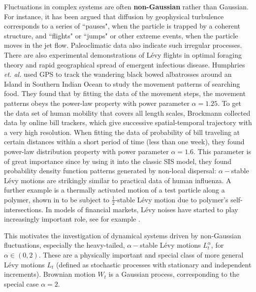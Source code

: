 \documentclass[11pt]{article}
\begin{document}
Fluctuations in complex systems   are often
{\bf non-Gaussian} \cite{Woy,Dit,Swinney,Shlesinger,taqqu,dybiec2009levy}
rather than Gaussian.
For instance, it has been argued
that diffusion by geophysical turbulence \cite{Shlesinger}
corresponds  to a series of  ``pauses", when the
particle is trapped by a coherent structure, and ``flights" or
``jumps" or other extreme events, when the particle moves in the jet
flow. Paleoclimatic data \cite{Dit} also indicate such irregular
processes. There are also experimental demonstrations of L\'evy flights  in optimal
foraging theory and rapid geographical spread of emergent infectious
disease.   Humphries {\it et. al.} \cite{Humphries}   used GPS to track the wandering
black bowed albatrosses around an Island in Southern Indian Ocean to
study the movement patterns of searching food.   They found that
by fitting the data of the movement steps, the movement patterns
obeys the power-law property with power parameter $\alpha=1.25$.
To get the data set of human mobility that covers
all length scales,  Brockmann   \cite{Brockmann}  collected data by online bill trackers, which
  give successive spatial-temporal trajectory with a very high
resolution. When fitting the data of probability of bill traveling
at certain distances within a short period of time (less than one
week), they found power-law distribution property
with power parameter $\alpha=1.6$.
This parameter is of great importance since by using it into the
classic SIS model, they found probability density function patterns
generated by non-local dispersal:  $\alpha-$stable L\'evy motions are
strikingly similar to practical data of human influenza.
A further example is a thermally activated motion of a test particle along
a polymer,   shown in \cite{sokolov1997paradoxal, brockmann2002levy}
to be subject to $\frac{1}{2}$-stable L\'evy motion
due to polymer's self-intersections.
In models of financial markets,
L\'evy noises have started to play increasingly important role, see
for example \cite{eberlein2001term}.

This motivates the investigation of dynamical systems driven by non-Gaussian fluctuations, especially the heavy-tailed,  $\alpha-$stable   L\'evy motions $L_t^{\alpha}$,
for $\alpha \in (0, 2)$. These are a physically important and special class of more general L\'evy motions   $L_t$  (defined as   stochastic processes with stationary
and independent increments).
Brownian motion $W_t$ is a Gaussian process, corresponding to the special case $\alpha=2$.


\end{document}
